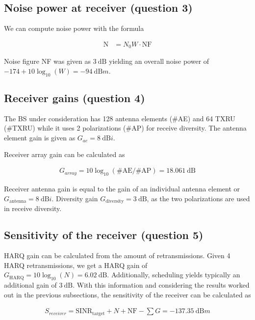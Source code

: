 \documentclass{article}
\begin{document}
\subsection{Noise power at receiver (question 3)}

We can compute noise power with the formula 

\begin{align*}
     \mathrm{N} &= N_0 W \cdot \mathrm{NF}
\end{align*}

Noise figure NF was given as \(\SI{3}{\deci\bel}\) yielding an overall noise power of \(-174 + 10 \log_{10} (W) = \SI{-94}{\deci\bel m}\).

\subsection{Receiver gains (question 4)}

The BS under consideration has 128 antenna elements (\#AE) and 64 TXRU (\#TXRU) while it uses 2 polarizations (\#AP) for receive diversity. The antenna element gain is given as \(G_{ae} =  \SI{8}{\deci\bel i}\).

Receiver array gain can be calculated as

\begin{align*}
    G_{array} = 10 \log_{10} (\mathrm{\#AE}/\mathrm{\#AP}) = \SI{18.061}{\deci\bel}
\end{align*}

Receiver antenna gain is equal to the gain of an individual antenna element or \(G_{\mathrm{antenna}} = \SI{8}{\deci\bel i}\). Diversity gain \(G_{\mathrm{diversity}} = \SI{3}{\deci\bel}\), as the two polarizations are used in receive diversity.

\subsection{Sensitivity of the receiver (question 5)}

HARQ gain can be calculated from the amount of retransmissions. Given 4 HARQ retransmissions, we get a HARQ gain of \(G_{\mathrm{HARQ}} = 10 \log_{10} (N) = \SI{6.02}{\deci\bel}\). Additionally, scheduling yields typically an additional gain of  \(\SI{3}{\deci\bel}\). With this information and considering the results worked out in the previous subsections, the sensitivity of the receiver can be calculated as

\begin{align*}
    S_{receiver} = \mathrm{SINR_{target}} + N + \mathrm{NF} - \sum G = \SI{-137.35}{\deci\bel m}
\end{align*}
\end{document}
